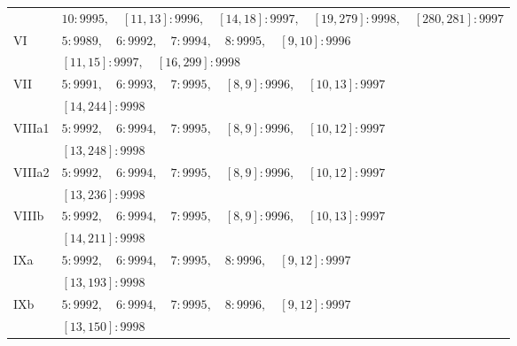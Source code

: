 \documentclass[11pt,reqno]{amsart}
\numberwithin{equation}{section}
\theoremstyle{definition}
\theoremstyle{remark}
\begin{document}
\begin{longtable}{@{}lp{}@{}}
 & $10:9995,\quad [11,13]:9996,\quad [14,18]:9997,\quad [19,279]:9998,\quad [280,281]:9997$\\
VI & $5:9989,\quad 6:9992,\quad 7:9994,\quad 8:9995,\quad [9,10]:9996$\\
 & $[11,15]:9997,\quad [16,299]:9998$\\
VII & $5:9991,\quad 6:9993,\quad 7:9995,\quad [8,9]:9996,\quad [10,13]:9997$\\
 & $[14,244]:9998$\\
VIIIa1 & $5:9992,\quad 6:9994,\quad 7:9995,\quad [8,9]:9996,\quad [10,12]:9997$\\
 & $[13,248]:9998$\\
VIIIa2 & $5:9992,\quad 6:9994,\quad 7:9995,\quad [8,9]:9996,\quad [10,12]:9997$\\
 & $[13,236]:9998$\\
VIIIb & $5:9992,\quad 6:9994,\quad 7:9995,\quad [8,9]:9996,\quad [10,13]:9997$\\
 & $[14,211]:9998$\\
IXa & $5:9992,\quad 6:9994,\quad 7:9995,\quad 8:9996,\quad [9,12]:9997$\\
 & $[13,193]:9998$\\
IXb & $5:9992,\quad 6:9994,\quad 7:9995,\quad 8:9996,\quad [9,12]:9997$\\
 & $[13,150]:9998$\\
\bottomrule\end{longtable}
\end{document}

